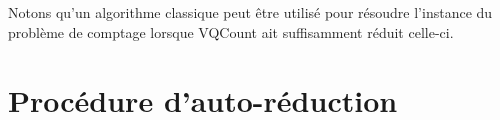 Notons qu'un algorithme classique peut être utilisé pour résoudre l'instance du problème de comptage lorsque VQCount ait suffisamment réduit celle-ci.






\section{Procédure d'auto-réduction}
\label{sec:procedure-auto-reduction}

